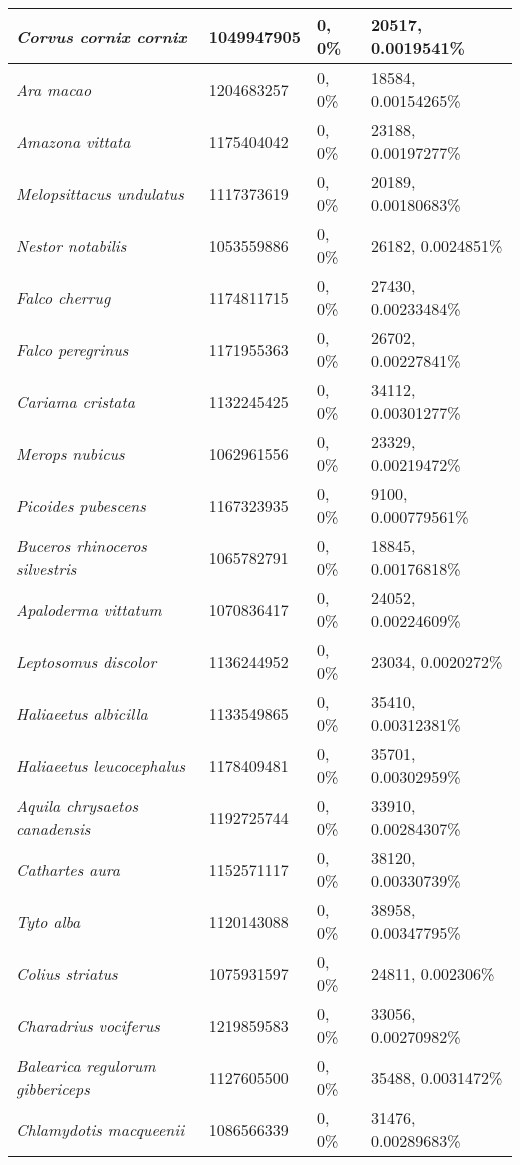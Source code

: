 {\begin{longtable}{| L{4cm} | L{2.7cm}  | L{3.7cm} | L{3.7cm} |}
\textit{Corvus cornix cornix} & 1049947905 & 0, 0\% & 20517, 0.0019541\% \\ \hline
\textit{Ara macao} & 1204683257 & 0, 0\% & 18584, 0.00154265\% \\ \hline
\textit{Amazona vittata} & 1175404042 & 0, 0\% & 23188, 0.00197277\% \\ \hline
\textit{Melopsittacus undulatus} & 1117373619 & 0, 0\% & 20189, 0.00180683\% \\ \hline
\textit{Nestor notabilis} & 1053559886 & 0, 0\% & 26182, 0.0024851\% \\ \hline
\textit{Falco cherrug} & 1174811715 & 0, 0\% & 27430, 0.00233484\% \\ \hline
\textit{Falco peregrinus} & 1171955363 & 0, 0\% & 26702, 0.00227841\% \\ \hline
\textit{Cariama cristata} & 1132245425 & 0, 0\% & 34112, 0.00301277\% \\ \hline
\textit{Merops nubicus} & 1062961556 & 0, 0\% & 23329, 0.00219472\% \\ \hline
\textit{Picoides pubescens} & 1167323935 & 0, 0\% & 9100, 0.000779561\% \\ \hline
\textit{Buceros rhinoceros silvestris} & 1065782791 & 0, 0\% & 18845, 0.00176818\% \\ \hline
\textit{Apaloderma vittatum} & 1070836417 & 0, 0\% & 24052, 0.00224609\% \\ \hline
\textit{Leptosomus discolor} & 1136244952 & 0, 0\% & 23034, 0.0020272\% \\ \hline
\textit{Haliaeetus albicilla} & 1133549865 & 0, 0\% & 35410, 0.00312381\% \\ \hline
\textit{Haliaeetus leucocephalus} & 1178409481 & 0, 0\% & 35701, 0.00302959\% \\ \hline
\textit{Aquila chrysaetos canadensis} & 1192725744 & 0, 0\% & 33910, 0.00284307\% \\ \hline
\textit{Cathartes aura} & 1152571117 & 0, 0\% & 38120, 0.00330739\% \\ \hline
\textit{Tyto alba} & 1120143088 & 0, 0\% & 38958, 0.00347795\% \\ \hline
\textit{Colius striatus} & 1075931597 & 0, 0\% & 24811, 0.002306\% \\ \hline
\textit{Charadrius vociferus} & 1219859583 & 0, 0\% & 33056, 0.00270982\% \\ \hline
\textit{Balearica regulorum gibbericeps} & 1127605500 & 0, 0\% & 35488, 0.0031472\% \\ \hline
\textit{Chlamydotis macqueenii} & 1086566339 & 0, 0\% & 31476, 0.00289683\% \\ \hline

\end{longtable}}

